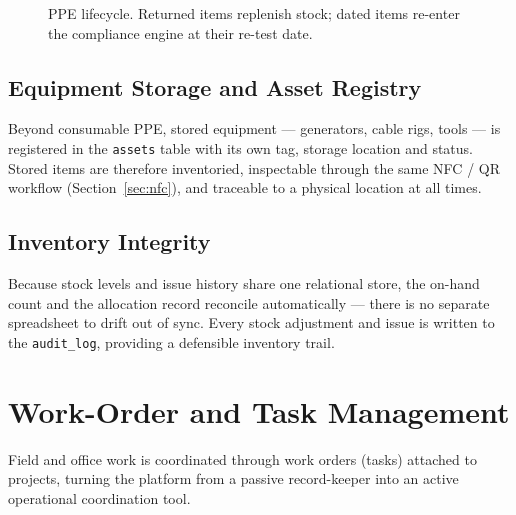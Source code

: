 \documentclass[11pt]{article}
\begin{document}
\begin{figure}[H]
\centering
{}
\caption{PPE lifecycle. Returned items replenish stock; dated items re-enter the compliance engine at
their re-test date.}
\end{figure}

\subsection{Equipment Storage and Asset Registry}
Beyond consumable PPE, stored equipment --- generators, cable rigs, tools --- is registered in the
\texttt{assets} table with its own tag, storage location and status. Stored items are therefore
inventoried, inspectable through the same NFC / QR workflow (Section~\ref{sec:nfc}), and traceable to a
physical location at all times.

\subsection{Inventory Integrity}
Because stock levels and issue history share one relational store, the on-hand count and the allocation
record reconcile automatically --- there is no separate spreadsheet to drift out of sync. Every stock
adjustment and issue is written to the \texttt{audit\_log}, providing a defensible inventory trail.

\section{Work-Order and Task Management}\label{sec:tasks}
Field and office work is coordinated through work orders (tasks) attached to projects, turning the
platform from a passive record-keeper into an active operational coordination tool.
\end{document}
